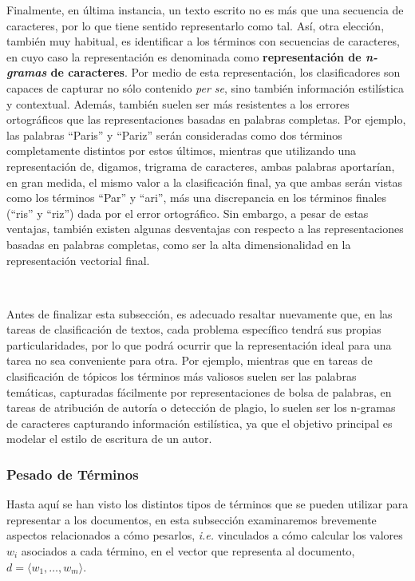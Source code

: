 Finalmente, en última instancia, un texto escrito no es más que una secuencia de caracteres, por lo que tiene sentido representarlo como tal. Así, otra elección, también muy habitual, es identificar a los términos con secuencias de caracteres, en cuyo caso la representación es denominada como \textbf{representación de \emph{n-gramas} de caracteres}.
Por medio de esta representación, los clasificadores son capaces de capturar no sólo contenido \emph{per se}, sino también información estilística y contextual\cite{stamatatos2009survey}.
Además, también suelen ser más resistentes a los errores ortográficos que las representaciones basadas en palabras completas. Por ejemplo, las palabras ``Paris'' y ``Pariz'' serán consideradas como dos términos completamente distintos por estos últimos, mientras que utilizando una representación de, digamos, trigrama de caracteres, ambas palabras aportarían, en gran medida, el mismo valor a la clasificación final, ya que ambas serán vistas como los términos ``Par''  y ``ari'', más una discrepancia en los términos finales (``ris'' y ``riz'') dada por el error ortográfico.
Sin embargo, a pesar de estas ventajas, también existen algunas desventajas con respecto a las representaciones basadas en palabras completas, como ser la alta dimensionalidad en la representación vectorial final.

\

Antes de finalizar esta subsección, es adecuado resaltar nuevamente que, en las tareas de clasificación de textos, cada problema específico tendrá sus propias particularidades, por lo que podrá ocurrir que la representación ideal para una tarea no sea conveniente para otra.
Por ejemplo, mientras que en tareas de clasificación de tópicos los términos más valiosos suelen ser las palabras temáticas, capturadas fácilmente por representaciones de bolsa de palabras, en tareas de atribución de autoría o detección de plagio, lo suelen ser los n-gramas de caracteres capturando información estilística, ya que el objetivo principal es modelar el estilo de escritura de un autor\cite{stamatatos2009survey}.
 
\subsubsection{Pesado de Términos}

Hasta aquí se han visto los distintos tipos de términos que se pueden utilizar para representar a los documentos, en esta subsección examinaremos brevemente aspectos relacionados a cómo pesarlos, \emph{i.e.} vinculados a cómo calcular los valores $w_i$ asociados a cada término, en el vector que representa al documento, $d=\langle w_1,\dots,w_m\rangle$.

